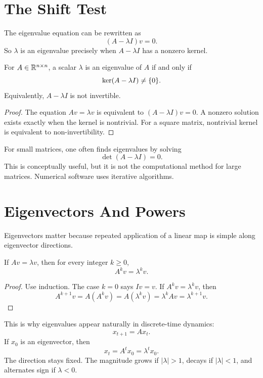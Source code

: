 \section{The Shift Test}

The eigenvalue equation can be rewritten as
\[
  (A-\lambda I)v=0.
\]
So $\lambda$ is an eigenvalue precisely when $A-\lambda I$ has a nonzero
kernel.

\begin{proposition}
For $A\in\mathbb{R}^{n\times n}$, a scalar $\lambda$ is an eigenvalue of $A$ if and
only if
\[
  \operatorname{ker}(A-\lambda I)\neq\{0\}.
\]
Equivalently, $A-\lambda I$ is not invertible.
\end{proposition}

\begin{proof}
The equation $Av=\lambda v$ is equivalent to $(A-\lambda I)v=0$. A nonzero
solution exists exactly when the kernel is nontrivial. For a square matrix,
nontrivial kernel is equivalent to non-invertibility.
\end{proof}

For small matrices, one often finds eigenvalues by solving
\[
  \det(A-\lambda I)=0.
\]
This is conceptually useful, but it is not the computational method for large
matrices. Numerical software uses iterative algorithms.

\section{Eigenvectors And Powers}

Eigenvectors matter because repeated application of a linear map is simple
along eigenvector directions.

\begin{proposition}
If $Av=\lambda v$, then for every integer $k\geq 0$,
\[
  A^kv=\lambda^k v.
\]
\end{proposition}

\begin{proof}
Use induction. The case $k=0$ says $I v=v$. If $A^kv=\lambda^k v$, then
\[
  A^{k+1}v=A(A^kv)=A(\lambda^k v)=\lambda^k Av=\lambda^{k+1}v.
\]
\end{proof}

This is why eigenvalues appear naturally in discrete-time dynamics:
\[
  x_{t+1}=Ax_t.
\]
If $x_0$ is an eigenvector, then
\[
  x_t=A^t x_0=\lambda^t x_0.
\]
The direction stays fixed. The magnitude grows if $|\lambda|>1$, decays if
$|\lambda|<1$, and alternates sign if $\lambda<0$.

